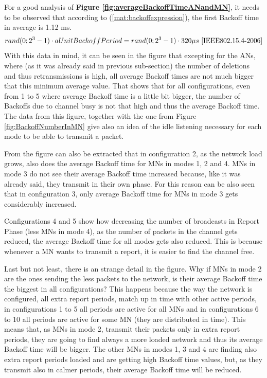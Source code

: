 For a good analysis of \textbf{Figure \ref{fig:averageBackoffTimeANandMN}}, it needs to be observed that according to (\ref{mat:backoffexpression}),
the first Backoff time in average is 1.12 ms.
\begin{equation}
  rand(0;  2^3-1)\cdot aUnitBackoffPeriod = rand(0; 2^3-1)\cdot 320\mu s\ \cite{IEEE802.15.4-2006}
  \label{mat:backoffexpression}
\end{equation}
With this data in mind, it can be seen in the figure that excepting for the \acp{AN}, where (as it was already said in previous sub-section) the 
number of deletions and thus retransmissions is high, all average Backoff times are not much bigger that this minimum average value. That shows that for
all configurations, even from 1 to 5 where average Backoff time is a little bit bigger, the number of Backoffs due to channel 
busy is not that high and thus the average Backoff time. The data from this figure, together with the one from Figure \ref{fig:BackoffNumberInMN} give
also an idea of the idle listening necessary for each mode to be able to transmit a packet.

From the figure can also be extracted that in configuration 2, as the network load grows, also does the average Backoff time for \acp{MN} in modes 1, 2 
and 4. \acp{MN} in mode 3 do not see their average Backoff time increased because, like it was already said, they transmit in their own phase. For this
reason can be also seen that in configuration 3, only average Backoff time for \acp{MN} in mode 3 gets considerably increased.

Configurations 4 and 5 show how decreasing the number of broadcasts in Report Phase (less \acp{MN} in mode 4), as the number of packets in the channel
gets reduced, the average Backoff time for all modes gets also reduced. This is because whenever a \ac{MN} wants to transmit a report, it is easier to 
find the channel free.

Last but not least, there is an strange detail in the figure. Why if \acp{MN} in mode 2 are the ones sending the less packets to the network, is their 
average Backoff time the biggest in all configurations? This happens because the way the network is configured, all extra report periods, match up in time
with other active periods, in configurations 1 to 5 all periods are active for all \acp{MN} and in configurations 6 to 10 all periods are active for 
some \ac{MN} (they are distributed in time). This means that, as \acp{MN} in mode 2, transmit their packets only in extra report periods, they are going to 
find always a more loaded network and thus its average Backoff time will be bigger. The other \acp{MN} in modes 1, 3 and 4 are finding also extra report 
periods loaded and are getting high Backoff time values, but, as they transmit also in calmer periods, their average Backoff time will be reduced.

